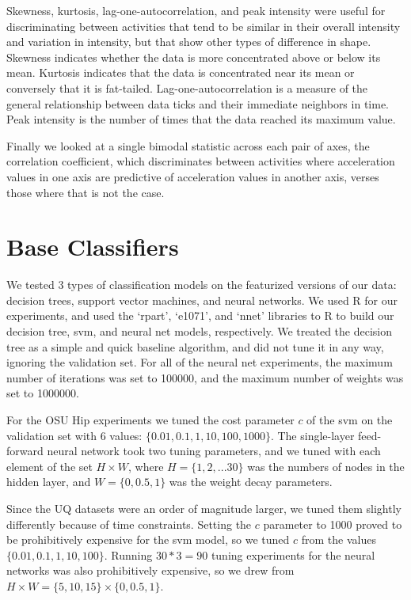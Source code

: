 Skewness, kurtosis, lag-one-autocorrelation, and peak intensity
were useful for discriminating between
activities that tend to be similar in their overall intensity and variation in intensity,
but that show other types of difference in shape. Skewness indicates whether the data is
more concentrated above or below its mean. Kurtosis indicates that the data is concentrated
near its mean or conversely that it is fat-tailed. Lag-one-autocorrelation is a measure of
the general relationship between data ticks and their immediate neighbors in time. Peak
intensity is the number of times that the data reached its maximum value. 

Finally we looked at a single bimodal statistic across each pair of axes, the correlation
coefficient, which discriminates between activities where acceleration values in one axis
are predictive of acceleration values in another axis, verses those where that is not the case.

\section{Base Classifiers}

We tested 3 types of classification models on the featurized versions of our data:
decision trees, support vector machines, and neural networks. We used R for our
experiments, and used the `rpart', `e1071', and `nnet' libraries to R to build
our decision tree, svm, and neural net models, respectively. We treated the
decision tree as a simple and quick baseline algorithm, and did not tune it in
any way, ignoring the validation set. For all of the neural net experiments,
the maximum number of iterations was set to 100000, and the maximum number of
weights was set to 1000000.

For the OSU Hip experiments we tuned the
cost parameter $c$ of the svm on the validation set with 6 values:
$\{0.01,0.1,1,10,100,1000\}$. The single-layer feed-forward neural network took
two tuning parameters, and we tuned with each element of the set $H \times W$,
where $H = \{1,2,...30\}$ was the numbers of nodes in the hidden layer, and 
$W = \{0,0.5,1\}$ was the weight decay parameters.

Since the UQ datasets were an order of magnitude larger, we tuned them
slightly differently because of time constraints. Setting the $c$ parameter to
1000 proved to be prohibitively expensive for the svm model, so we tuned $c$
from the values $\{0.01,0.1,1,10,100\}$. Running $30*3=90$ tuning experiments
for the neural networks was also prohibitively expensive, so we drew from
$H \times W = \{5,10,15\} \times \{0,0.5,1\}$.

